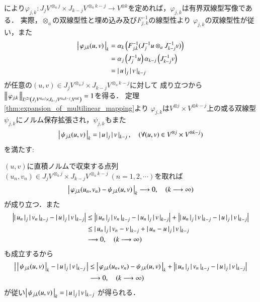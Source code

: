 	により$\varphi_{j,k}:J_j V^{\otimes_a j} \times J_{k-j} V^{\otimes_a k-j}
	\longrightarrow V^{\otimes k}$を定めれば，$\varphi_{j,k}$は有界双線型写像である．
	実際，$\otimes_a$の双線型性と埋め込み及び$F_{j,k}^{-1}$の線型性より
	$\varphi_{j,k}$の双線型性が従い，また
	\begin{align}
		\compcrossnorm{\varphi_{j,k}(u,v)}{k}
		&= \crossnorm{F_{j,k}^{-1} (J_j^{-1}u \otimes_a J_{k-j}^{-1}v)}{k} \\
		&= \crossnorm{J_j^{-1}u}{j} \crossnorm{J_{k-j}^{-1}v}{k-j} \\
		&= \compcrossnorm{u}{j} \compcrossnorm{v}{k-j}
	\end{align}
	が任意の$(u,v) \in J_j V^{\otimes_a j} \times J_{k-j} V^{\otimes_a k-j}$に対して
	成り立つから$\Norm{\varphi_{j,k}}{\ContLn{J_j V^{\otimes_a j} \times J_{k-j} V^{\otimes_a k-j}}{V^{\otimes k}}{2}} = 1$を得る．
	定理\ref{thm:expansion_of_multilinear_mapping}より
	$\varphi_{j,k}$は$V^{\otimes j} \times V^{\otimes k-j}$上の或る双線型
	$\psi_{j,k}$にノルム保存拡張され，$\psi_{j,k}$もまた
	\begin{align}
		\compcrossnorm{\psi_{j,k}(u,v)}{k} = \compcrossnorm{u}{j} \compcrossnorm{v}{k-j},
		\quad (\forall (u,v) \in V^{\otimes j} \times V^{\otimes k-j})
	\end{align}
	を満たす:
	
	\begin{prf}
		$(u,v)$に直積ノルムで収束する点列$(u_n,v_n) \in J_j V^{\otimes_a j} \times J_{k-j} V^{\otimes_a k-j}\ (n=1,2,\cdots)$を取れば
		\begin{align}
			\compcrossnorm{\varphi_{j,k}(u_n,v_n) - \psi_{j,k}(u,v)}{k} \longrightarrow 0,
			\quad (k \longrightarrow \infty)
		\end{align}
		が成り立つ．また
		\begin{align}
			\left| \compcrossnorm{u_n}{j} \compcrossnorm{v_n}{k-j} - 
			\compcrossnorm{u}{j} \compcrossnorm{v}{k-j} \right|
			&\leq \left| \compcrossnorm{u_n}{j} \compcrossnorm{v_n}{k-j} - 
			\compcrossnorm{u_n}{j} \compcrossnorm{v}{k-j} \right| 
			+ \left| \compcrossnorm{u_n}{j} \compcrossnorm{v}{k-j} - 
			\compcrossnorm{u}{j} \compcrossnorm{v}{k-j} \right| \\
			&\leq \compcrossnorm{u_n}{j} \compcrossnorm{v_n - v}{k-j} 
			+ \compcrossnorm{u_n - u}{j} \compcrossnorm{v}{k-j} \\
			&\longrightarrow 0, \quad (k \longrightarrow \infty)
		\end{align}
		も成立するから
		\begin{align}
			\left|\, \compcrossnorm{\psi_{j,k}(u,v)}{k} - \compcrossnorm{u}{j} \compcrossnorm{v}{k-j}\, \right|
			&\leq \compcrossnorm{\varphi_{j,k}(u_n,v_n) - \psi_{j,k}(u,v)}{k}
				+ \left| \compcrossnorm{u_n}{j} \compcrossnorm{v_n}{k-j} - 
			\compcrossnorm{u}{j} \compcrossnorm{v}{k-j} \right| \\
			& \longrightarrow 0, \quad (k \longrightarrow \infty)
		\end{align}
		が従い$\compcrossnorm{\psi_{j,k}(u,v)}{k} = \compcrossnorm{u}{j} \compcrossnorm{v}{k-j}$
		が得られる．
		\QED
	\end{prf}
	
